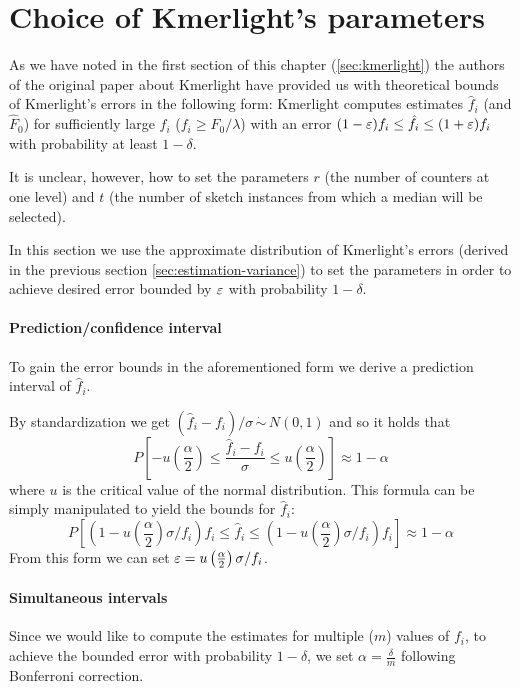 \section{Choice of Kmerlight's parameters}
\label{sec:parameters-choice}

As we have noted in the first section of this chapter (\ref{sec:kmerlight})
the authors of the original paper about Kmerlight \cite{Sivadasan2016} have
provided us with theoretical bounds of Kmerlight's errors in the following form:
Kmerlight computes estimates $\hat f_i$ (and $\hat F_0$) for sufficiently large
$f_i$ ($f_i \geq F_0 / \lambda$) with an error $(1-\varepsilon)f_i \leq \hat f_i \leq (1+\varepsilon)f_i$
with probability at least $1 - \delta$.

It is unclear, however, how to set the parameters $r$ (the number of counters at one level) 
and $t$ (the number of sketch instances from which a median will be selected).

In this section we use the approximate distribution of Kmerlight's errors (derived in the
previous section \ref{sec:estimation-variance}) to set the parameters in order to achieve
desired error bounded by $\varepsilon$ with probability $1-\delta$.

\paragraph{Prediction/confidence interval} To gain the error bounds
in the aforementioned form we derive a prediction interval of $\hat f_i$. 

By standardization we get $(\hat f_i - f_i)/\sigma \,\dot\sim\, N(0,1)$ and so it holds that
$$P\left[-u\left(\frac{\alpha}{2}\right) \leq 
\frac{\hat f_i - f_i}{\sigma} \leq 
u\left(\frac{\alpha}{2}\right) \right] \approx 1 - \alpha$$
where $u$ is the critical value of the normal distribution. This formula can be simply
manipulated to yield the bounds for $\hat f_i$:
$$P\left[\left(1-u\left(\frac{\alpha}{2}\right)\sigma/f_i\right) f_i \leq \hat f_i \leq \left(1-u\left(\frac{\alpha}{2}\right)\sigma/f_i\right) f_i \right] \approx 1 - \alpha$$
From this form we can set $\varepsilon = u\left(\frac{\alpha}{2}\right)\sigma/f_i$.

\paragraph{Simultaneous intervals} Since we would like to compute the estimates
for multiple ($m$) values of $f_i$, to achieve the bounded error with probability
$1 - \delta$, we set $\alpha = \frac{\delta}{m}$ following Bonferroni correction.

